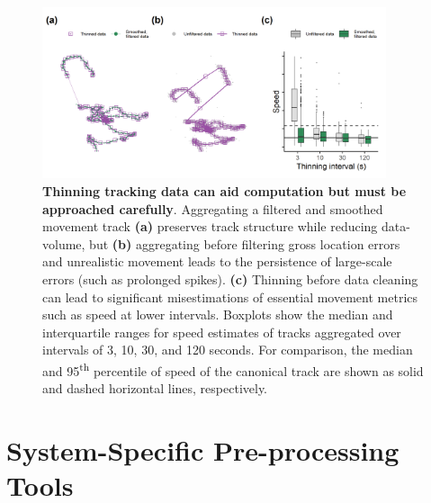    \begin{figure}[ht!]
        \centering
        \includegraphics[width=0.9\textwidth]{figures/preprocessing/fig_05.png}
        \caption{
            \textbf{Thinning tracking data can aid computation but must be approached carefully}.
            Aggregating a filtered and smoothed movement track \textbf{(a)} preserves track structure while reducing data-volume, but \textbf{(b)} aggregating before filtering gross location errors and unrealistic movement leads to the persistence of large-scale errors (such as prolonged spikes).
            \textbf{(c)} Thinning before data cleaning can lead to significant misestimations of essential movement metrics such as speed at lower intervals.
            Boxplots show the median and interquartile ranges for speed estimates of tracks aggregated over intervals of 3, 10, 30, and 120 seconds.
            For comparison, the median and 95\textsuperscript{th} percentile of speed of the canonical track are shown as solid and dashed horizontal lines, respectively.
        }
        \label{preproc_fig_05}
    \end{figure}

    \section*{System-Specific Pre-processing Tools}


